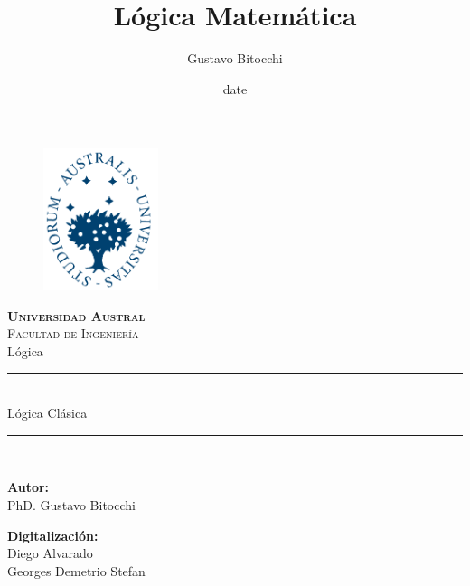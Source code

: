 \documentclass[12pt]{report}
\begin{document}
\title{Lógica Matemática}
\author{Gustavo Bitocchi}
\date{date}

\begin{titlepage}
\begin{figure}[t]
    \centering\includegraphics[width=0.3\textwidth]{SharedImages/logo.png}
\end{figure}
\begin{center}
    \textsc{ \LARGE \textbf{Universidad Austral}{ \\}}
	\textsc{ \LARGE{Facultad de Ingeniería \\ }}
	\textnormal{ \Large{Lógica \\}}
	\vspace{5mm}
	\fontsize{10mm}{10mm}\selectfont 
	 \rule[0.50]{9cm}{0.4pt}\\
    \textup{Lógica Clásica}\\    
    \rule[0.50\baselineskip]{9cm}{0.4pt}\\

    
\end{center}

\vspace{10mm}

\begin{minipage}[t]{0.47\textwidth}
	\textnormal{\large{\bf Autor: \\}}
	{\large PhD. Gustavo Bitocchi \\}
\end{minipage}\hfill\begin{minipage}[t]{0.47\textwidth}\raggedleft
	\textnormal{\large{\bf Digitalización: \\}}
	{\large Diego Alvarado\\ Georges Demetrio Stefan}
\end{minipage}

\vspace{20mm}


\end{titlepage}
\end{document}

